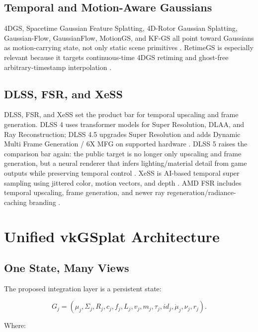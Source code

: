 \documentclass[11pt]{article}
\begin{document}
\subsection{Temporal and Motion-Aware Gaussians}

4DGS, Spacetime Gaussian Feature Splatting, 4D-Rotor Gaussian Splatting,
Gaussian-Flow, GaussianFlow, MotionGS, and KF-GS all point toward Gaussians as
motion-carrying state, not only static scene primitives
\cite{wu2024dynamic4dgs,li2023spacetime,duan2024rotor4dgs,lin2023gaussianflow,gao2024gaussianflow,zhu2024motiongs,liu2026kfgs}.
RetimeGS is especially relevant because it targets continuous-time 4DGS
retiming and ghost-free arbitrary-timestamp interpolation
\cite{wang2026retimegs}.

\subsection{DLSS, FSR, and XeSS}

DLSS, FSR, and XeSS set the product bar for temporal upscaling and frame
generation. DLSS 4 uses transformer models for Super Resolution, DLAA, and Ray
Reconstruction; DLSS 4.5 upgrades Super Resolution and adds Dynamic Multi Frame
Generation / 6X MFG on supported hardware
\cite{nvidia2025dlss4,nvidia2025dlss4research,nvidia2026dlss45}. DLSS 5 raises
the comparison bar again: the public target is no longer only upscaling and
frame generation, but a neural renderer that infers lighting/material detail
from game outputs while preserving temporal control \cite{nvidia2026dlss5}.
XeSS is AI-based temporal super sampling using jittered color, motion vectors,
and depth \cite{intel2026xess}. AMD FSR includes temporal upscaling, frame
generation, and newer ray regeneration/radiance-caching branding
\cite{amd2026fsr}.

\section{Unified vkGSplat Architecture}

\subsection{One State, Many Views}

The proposed integration layer is a persistent state:

\[
  G_j =
  (\mu_j, \Sigma_j, R_j, c_j, f_j, L_j, v_j, m_j,
   \tau_j, id_j, \dot{\mu}_j, \nu_j, r_j).
\]

Where:
\end{document}
